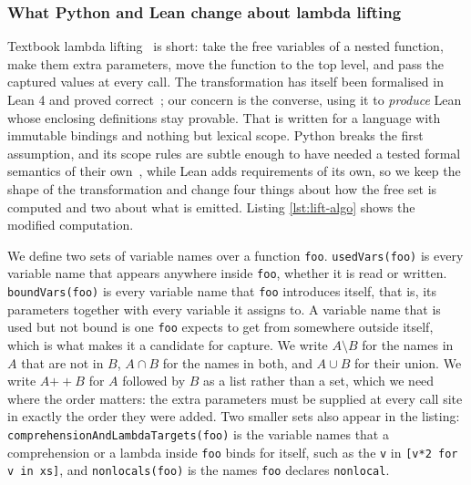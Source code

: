 \documentclass{article}
\newcommand{\code}{\lstinline}
\begin{document}
\subsubsection{What Python and Lean change about lambda lifting}

Textbook lambda lifting~\cite{johnsson1985lambdalifting} is short: take the free variables of a nested function, make them extra parameters, move the function to the top level, and pass the captured values at every call. The transformation has itself been formalised in Lean 4 and proved correct~\cite{levy2026simplelambdalifting}; our concern is the converse, using it to \emph{produce} Lean whose enclosing definitions stay provable. That is written for a language with immutable bindings and nothing but lexical scope. Python breaks the first assumption, and its scope rules are subtle enough to have needed a tested formal semantics of their own~\cite{politz2013fullmonty}, while Lean adds requirements of its own, so we keep the shape of the transformation and change four things about how the free set is computed and two about what is emitted. Listing \ref{lst:lift-algo} shows the modified computation. 

We define two sets of variable names over a function \code{foo}. \code{usedVars(foo)} is every variable name that appears anywhere inside \code{foo}, whether it is read or written. \code{boundVars(foo)} is every variable name that \code{foo} introduces itself, that is, its parameters together with every variable it assigns to. A variable name that is used but not bound is one \code{foo} expects to get from somewhere outside itself, which is what makes it a candidate for capture. We write $A \setminus B$ for the names in $A$ that are not in $B$, $A \cap B$ for the names in both, and $A \cup B$ for their union. We write $A \mathbin{+\!\!+} B$ for $A$ followed by $B$ as a list rather than a set, which we need where the order matters: the extra parameters must be supplied at every call site in exactly the order they were added. Two smaller sets also appear in the listing: \code{comprehensionAndLambdaTargets(foo)} is the variable names that a comprehension or a lambda inside \code{foo} binds for itself, such as the \code{v} in \code{[v*2 for v in xs]}, and \code{nonlocals(foo)} is the names \code{foo} declares \code{nonlocal}.
\end{document}
